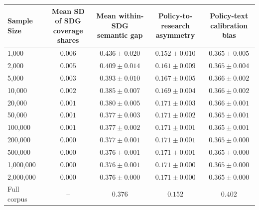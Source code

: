 \begin{tabular}{lcccc}
\toprule
Sample Size & \shortstack{Mean SD of SDG\\coverage shares} & \shortstack{Mean within-SDG\\semantic gap} & \shortstack{Policy-to-research\\asymmetry} & \shortstack{Policy-text\\calibration bias} \\
\midrule
1,000 & $0.006$ & $0.436 \pm 0.020$ & $0.152 \pm 0.010$ & $0.365 \pm 0.005$ \\
2,000 & $0.005$ & $0.409 \pm 0.014$ & $0.161 \pm 0.009$ & $0.365 \pm 0.004$ \\
5,000 & $0.003$ & $0.393 \pm 0.010$ & $0.167 \pm 0.005$ & $0.366 \pm 0.002$ \\
10,000 & $0.002$ & $0.385 \pm 0.007$ & $0.169 \pm 0.004$ & $0.366 \pm 0.002$ \\
20,000 & $0.001$ & $0.380 \pm 0.005$ & $0.171 \pm 0.003$ & $0.366 \pm 0.001$ \\
50,000 & $0.001$ & $0.377 \pm 0.003$ & $0.171 \pm 0.002$ & $0.365 \pm 0.001$ \\
100,000 & $0.001$ & $0.377 \pm 0.002$ & $0.171 \pm 0.001$ & $0.365 \pm 0.001$ \\
200,000 & $0.000$ & $0.377 \pm 0.001$ & $0.171 \pm 0.001$ & $0.365 \pm 0.000$ \\
500,000 & $0.000$ & $0.376 \pm 0.001$ & $0.171 \pm 0.001$ & $0.365 \pm 0.000$ \\
1,000,000 & $0.000$ & $0.376 \pm 0.001$ & $0.171 \pm 0.000$ & $0.365 \pm 0.000$ \\
2,000,000 & $0.000$ & $0.376 \pm 0.000$ & $0.171 \pm 0.000$ & $0.365 \pm 0.000$ \\
Full corpus & -- & $0.376$ & $0.152$ & $0.402$ \\
\bottomrule
\end{tabular}
